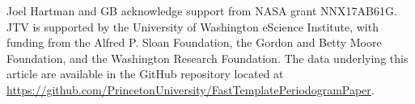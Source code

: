 \documentclass[apj]{emulateapj}
\begin{document}
\begin{acknowledgements}
    Joel Hartman and GB acknowledge support from NASA grant NNX17AB61G. JTV is supported by the University of Washington eScience Institute, with funding from the Alfred P. Sloan Foundation, the Gordon and Betty Moore Foundation, and the Washington Research Foundation. The data underlying this article are available in the GitHub repository located at \href{https://github.com/PrincetonUniversity/FastTemplatePeriodogramPaper}{https://github.com/PrincetonUniversity/FastTemplatePeriodogramPaper}.
\end{acknowledgements}



\end{document}
